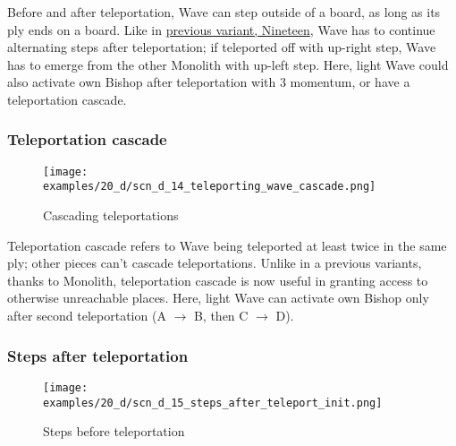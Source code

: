 Before and after teleportation, Wave can step outside of a board, as long as its ply ends
on a board. Like in \hyperref[fig:scn_n_08_teleport_wave_end]{previous variant, Nineteen},
Wave has to continue alternating steps after teleportation; if teleported off with up-right
step, Wave has to emerge from the other Monolith with up-left step. Here, light Wave could
also activate own Bishop after teleportation with 3 momentum, or have a teleportation cascade.

\clearpage %

\subsubsection*{Teleportation cascade}

\vspace*{-0.9\baselineskip}
\noindent
\begin{figure}[!h]
\texttt{[image: examples/20\_d/scn\_d\_14\_teleporting\_wave\_cascade.png]}
\caption{Cascading teleportations}
\label{fig:scn_d_14_teleporting_wave_cascade}
\end{figure}

Teleportation cascade refers to Wave being teleported at least twice in the same ply;
other pieces can't cascade teleportations. Unlike in a previous variants, thanks to
Monolith, teleportation cascade is now useful in granting access to otherwise unreachable
places. Here, light Wave can activate own Bishop only after second teleportation
(A $\rightarrow$ B, then C $\rightarrow$ D).

\clearpage %

\subsubsection*{Steps after teleportation}

\vspace*{-1.4\baselineskip}
\noindent
\begin{figure}[!h]
\texttt{[image: examples/20\_d/scn\_d\_15\_steps\_after\_teleport\_init.png]}
\caption{Steps before teleportation}
\label{fig:scn_d_15_steps_after_teleport_init}
\end{figure}

